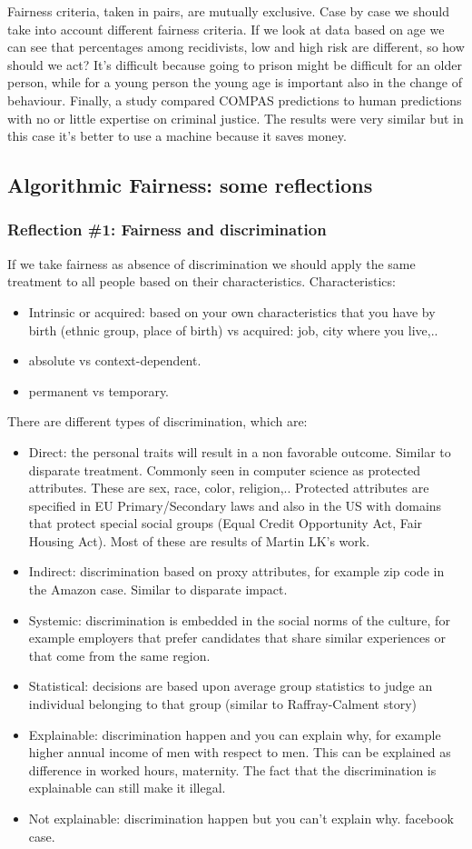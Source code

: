 Fairness criteria, taken in pairs, are mutually exclusive. Case by case we should take into account different fairness criteria. If we look at data based on age we can see that percentages among recidivists, low and high risk are different, so how should we act? It's difficult because going to prison might be difficult for an older person, while for a young person the young age is important also in the change of behaviour. Finally, a study compared COMPAS predictions to human predictions with no or little expertise on criminal justice. The results were very similar but in this case it's better to use a machine because it saves money.
\subsection{Algorithmic Fairness: some reflections}
\subsubsection{Reflection \#1: Fairness and discrimination}
If we take fairness as absence of discrimination we should apply the same treatment to all people based on their characteristics. Characteristics:
\begin{itemize}
    \item Intrinsic or acquired: based on your own characteristics that you have by birth (ethnic group, place of birth) vs acquired: job, city where you live,..
    \item absolute vs context-dependent.
    \item permanent vs temporary.
\end{itemize}
There are different types of discrimination, which are:
\begin{itemize}
    \item Direct: the personal traits will result in a non favorable outcome. Similar to disparate treatment. Commonly seen in computer science as protected attributes. These are sex, race, color, religion,.. Protected attributes are specified in EU Primary/Secondary laws and also in the US with domains that protect special social groups (Equal Credit Opportunity Act, Fair Housing Act). Most of these are results of Martin LK's work.
    \item Indirect: discrimination based on proxy attributes, for example zip code in the Amazon case. Similar to disparate impact.
    \item Systemic: discrimination is embedded in the social norms of the culture, for example employers that prefer candidates that share similar experiences or that come from the same region. 
    \item Statistical: decisions are based upon average group statistics to judge an individual belonging to that group (similar to Raffray-Calment story)
    \item Explainable: discrimination happen and you can explain why, for example higher annual income of men with respect to men. This can be explained as difference in worked hours, maternity. The fact that the discrimination is explainable can still make it illegal.
    \item Not explainable: discrimination happen but you can't explain why. facebook case.
\end{itemize}
